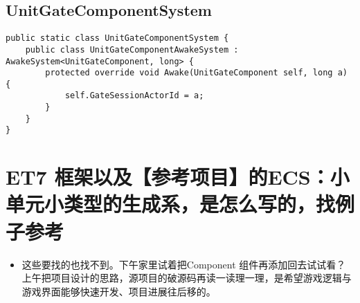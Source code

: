 \documentclass[9pt, b5paper]{article}
\begin{document}
\subsection{UnitGateComponentSystem}
\label{sec-8-2}
\begin{verbatim}
public static class UnitGateComponentSystem {
    public class UnitGateComponentAwakeSystem : AwakeSystem<UnitGateComponent, long> {
        protected override void Awake(UnitGateComponent self, long a) {
            self.GateSessionActorId = a;
        }
    }
}
\end{verbatim}


\section{ET7 框架以及【参考项目】的ECS：小单元小类型的生成系，是怎么写的，找例子参考}
\label{sec-9}
\begin{itemize}
\item 这些要找的也找不到。下午家里试着把Component 组件再添加回去试试看？上午把项目设计的思路，源项目的破源码再读一读理一理，是希望游戏逻辑与游戏界面能够快速开发、项目进展往后移的。
\end{itemize}
\end{document}
